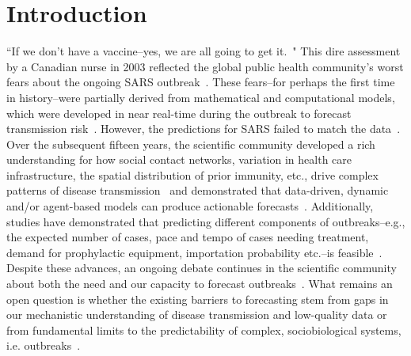 \documentclass[fleqn,12pt]{wlscirep}
\begin{document}
\section*{Introduction}
``If we don’t have a vaccine--yes, we are all going to get it.~\cite{shaw2007sars}" This dire assessment by a Canadian nurse in 2003 reflected the global public health community's worst fears about the ongoing SARS outbreak~\cite{dye2003modeling, colizza2007predictability}. These fears--for perhaps the first time in history--were partially derived from mathematical and computational models, which were developed in near real-time during the outbreak to forecast transmission risk~\cite{chretien2015advancing, colizza2007predictability}.  However, the predictions for SARS failed to match the data~\cite{meyers2005network, colizza2007predictability}.  Over the subsequent fifteen years, the scientific community developed a rich understanding for how social contact networks, variation in health care infrastructure, the spatial distribution of prior immunity, etc., drive complex patterns of disease transmission~\cite{perra2015modeling, gandon2016forecasting, reich2016challenges, viboud2018rapidd, peak2018population, wesolowski2015impact} and demonstrated that data-driven, dynamic and\slash or agent-based models can produce actionable forecasts~\cite{bansal2016big, funk2016real, pastore2016real, lofgren2014opinion, chowell2017perspectives, ray2018prediction}. Additionally, studies have demonstrated that predicting different components of outbreaks--e.g., the expected number of cases, pace and tempo of cases needing treatment, demand for prophylactic equipment, importation probability etc.--is feasible~\cite{colizza2007predictability, shaman:RealTime, venkatramanan2017using, johansson2016evaluating, brooks2015flexible, funk2016real, chowell2016using, zhang2015social, nsoesie2013simulation}.  Despite these advances, an ongoing debate continues in the scientific community about both the need and our capacity to forecast outbreaks~\cite{holmes2018pandemics, rivers2018modelling}. What remains an open question is whether the existing barriers to forecasting stem from gaps in our mechanistic understanding of disease transmission and low-quality data or from fundamental limits to the predictability of complex, sociobiological systems, i.e. outbreaks~\cite{hufnagel2004forecast, perra2015modeling, moran2016epidemic, gandon2016forecasting, chretien2015advancing,biggerstaff2016results,ostpForecasting}.
\end{document}

